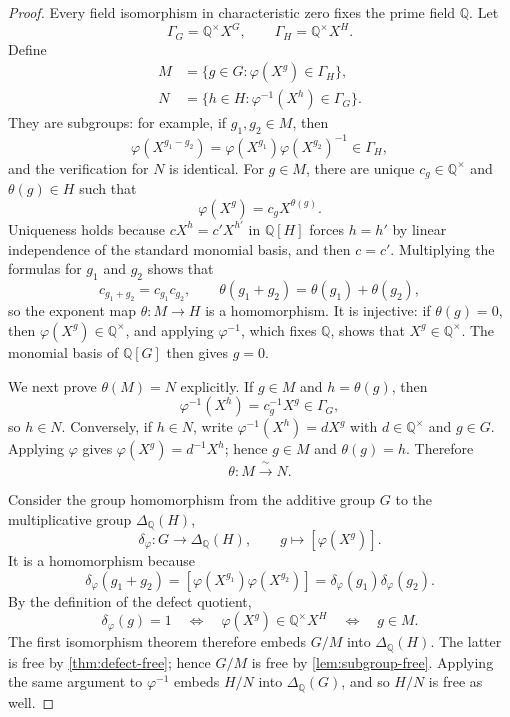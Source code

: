 \documentclass[11pt,a4paper]{article}
\numberwithin{equation}{section}
\theoremstyle{plain}
\theoremstyle{definition}
\theoremstyle{remark}
\newcommand{\Q}{\mathbb Q}
\newcommand{\DQ}[1]{\Delta_{\Q}(#1)}
\newcommand{\mon}[1]{X^{#1}}
\begin{document}
\begin{proof}
Every field isomorphism in characteristic zero fixes the prime field $\Q$.
Let
\[
  \Gamma_G=\Q^\times X^G,
  \qquad
  \Gamma_H=\Q^\times X^H.
\]
Define
\begin{align*}
  M&=\{g\in G:\varphi(\mon g)\in\Gamma_H\},\\
  N&=\{h\in H:\varphi^{-1}(\mon h)\in\Gamma_G\}.
\end{align*}
They are subgroups: for example, if $g_1,g_2\in M$, then
\[
  \varphi(\mon{g_1-g_2})
  =\varphi(\mon{g_1})\varphi(\mon{g_2})^{-1}\in\Gamma_H,
\]
and the verification for $N$ is identical.  For $g\in M$, there are unique
$c_g\in\Q^\times$ and $\theta(g)\in H$ such that
\[
  \varphi(\mon g)=c_g\mon{\theta(g)}.
\]
Uniqueness holds because
$c\mon h=c'\mon{h'}$ in $\Q[H]$ forces $h=h'$ by linear independence of
the standard monomial basis, and then $c=c'$.  Multiplying the formulas for
$g_1$ and $g_2$ shows that
\[
  c_{g_1+g_2}=c_{g_1}c_{g_2},
  \qquad
  \theta(g_1+g_2)=\theta(g_1)+\theta(g_2),
\]
so the exponent map $\theta:M\to H$ is a homomorphism.  It is injective: if
$\theta(g)=0$, then $\varphi(\mon g)\in\Q^\times$, and applying
$\varphi^{-1}$, which fixes $\Q$, shows that $\mon g\in\Q^\times$.  The
monomial basis of $\Q[G]$ then gives $g=0$.

We next prove $\theta(M)=N$ explicitly.  If $g\in M$ and
$h=\theta(g)$, then
\[
  \varphi^{-1}(\mon h)=c_g^{-1}\mon g\in\Gamma_G,
\]
so $h\in N$.  Conversely, if $h\in N$, write
$\varphi^{-1}(\mon h)=d\mon g$ with $d\in\Q^\times$ and $g\in G$.
Applying $\varphi$ gives
$\varphi(\mon g)=d^{-1}\mon h$; hence $g\in M$ and $\theta(g)=h$.
Therefore
\begin{equation}\label{eq:M-N-iso}
  \theta:M\xrightarrow{\ \sim\ }N.
\end{equation}

Consider the group homomorphism from the additive group $G$ to the
multiplicative group $\DQ H$,
\[
  \delta_\varphi:G\longrightarrow\DQ H,
  \qquad g\longmapsto[\varphi(\mon g)].
\]
It is a homomorphism because
\[
  \delta_\varphi(g_1+g_2)
  =[\varphi(\mon{g_1})\varphi(\mon{g_2})]
  =\delta_\varphi(g_1)\delta_\varphi(g_2).
\]
By the definition of the defect quotient,
\[
  \delta_\varphi(g)=1
  \quad\Longleftrightarrow\quad
  \varphi(\mon g)\in\Q^\times X^H
  \quad\Longleftrightarrow\quad g\in M.
\]
The first isomorphism theorem therefore embeds $G/M$ into $\DQ H$.
The latter is free by \cref{thm:defect-free}; hence $G/M$ is free by
\cref{lem:subgroup-free}.  Applying the same argument to $\varphi^{-1}$
embeds $H/N$ into $\DQ G$, and so $H/N$ is free as well.


\end{proof}
\end{document}

